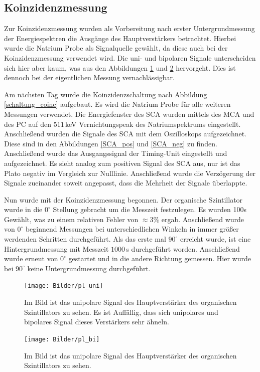 \subsection{Koinzidenzmessung}
Zur Koinzidenzmessung wurden als Vorbereitung nach erster Untergrundmessung der Energiespektren die Ausgänge des Hauptverstärkers betrachtet. Hierbei wurde die Natrium Probe als Signalquelle gewählt, da diese auch bei der Koinzidenzmessung verwendet wird. Die uni- und bipolaren Signale unterscheiden sich hier aber kaum, was aus den Abbildungen \ref{uni_org} und \ref{bip_org} hervorgeht. Dies ist dennoch bei der eigentlichen Messung vernachlässigbar.\par
Am nächsten Tag wurde die Koinzidenzschaltung nach Abbildung \ref{schaltung_coinc}  aufgebaut. Es wird die Natrium Probe für alle weiteren Messungen verwendet. Die Energiefenster des SCA wurden mittels des MCA und des PC auf den $511\,$keV Vernichtungspeak des Natriumspektrums eingestellt. Anschließend wurden die Signale des SCA mit dem Oszilloskops aufgezeichnet. Diese sind in den Abbildungen \ref{SCA_pos} und \ref{SCA_neg} zu finden. Anschließend wurde das Ausgangssignal der Timing-Unit eingestellt und aufgezeichnet. Es sieht analog zum positiven Signal des SCA aus, nur ist das Plato negativ im Vergleich zur Nulllinie. Anschließend wurde die Verzögerung der Signale zueinander soweit angepasst, dass die Mehrheit der Signale überlappte. \par
Nun wurde mit der Koinzidenzmessung begonnen. Der organische Szintillator wurde in die $0^\circ$ Stellung gebracht um die Messzeit festzulegen. Es wurden 100s Gewählt, was zu einem relativen Fehler von $\approx 3\%$ ergab. Anschließend wurde von $0^\circ$ beginnend Messungen bei unterschiedlichen Winkeln in immer größer werdenden Schritten  durchgeführt. Als das erste mal $90^\circ$ erreicht wurde, ist eine Hintergrundmessung mit Messzeit $1000\,$s durchgeführt worden. Anschließend wurde erneut von $0^\circ$ gestartet und in die andere Richtung gemessen. Hier wurde bei $90^\circ$ keine Untergrundmessung durchgeführt.

\begin{figure}[h]
	\centering
	\texttt{[image: Bilder/pl\_uni]}
	\caption[Unipolares Signal des Organischen Amp.]{\small Im Bild ist das unipolare Signal des Hauptverstärker des organischen Szintillators zu sehen. Es ist Auffällig, dass sich unipolares und bipolares Signal dieses Verstärkers sehr ähneln.}
	\label{uni_org}
\end{figure}
\begin{figure}[h]
	\centering
	\texttt{[image: Bilder/pl\_bi]}
	\caption[Bipolares Signal des Organischen Amp.]{\small Im Bild ist das unipolare Signal des Hauptverstärker des organischen Szintillators zu sehen. }
	\label{bip_org}
\end{figure}


